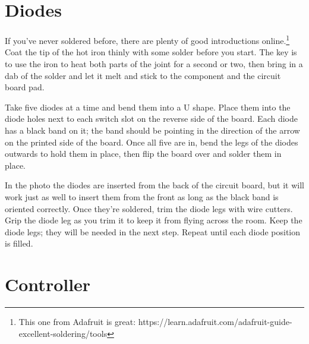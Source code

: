 \documentclass{article}
\begin{document}
\section{Diodes}

If you've never soldered before, there are plenty of good
introductions online.\footnote{This one from Adafruit is great:
  https://learn.adafruit.com/adafruit-guide-excellent-soldering/tools}
Coat the tip of the hot iron thinly with some solder before you
start. The key is to use the iron to heat both parts of the joint for
a second or two, then bring in a dab of the solder and let it melt and
stick to the component and the circuit board pad.

\vspace{1em}

Take five diodes at a time and bend them into a U shape. Place them
into the diode holes next to each switch slot on the reverse side of
the board. Each diode has a black band on it; the band should be
pointing in the direction of the arrow on the printed side of the
board. Once all five are in, bend the legs of the diodes outwards to
hold them in place, then flip the board over and solder them in place.

\vspace{1em}
\noindent{}
\vspace{1em}

In the photo the diodes are inserted from the back of the circuit
board, but it will work just as well to insert them from the front as
long as the black band is oriented correctly. Once they're soldered,
trim the diode legs with wire cutters. Grip the diode leg as you
trim it to keep it from flying across the room. Keep the diode legs;
they will be needed in the next step. Repeat until each diode position
is filled.

\section{Controller}
\end{document}

